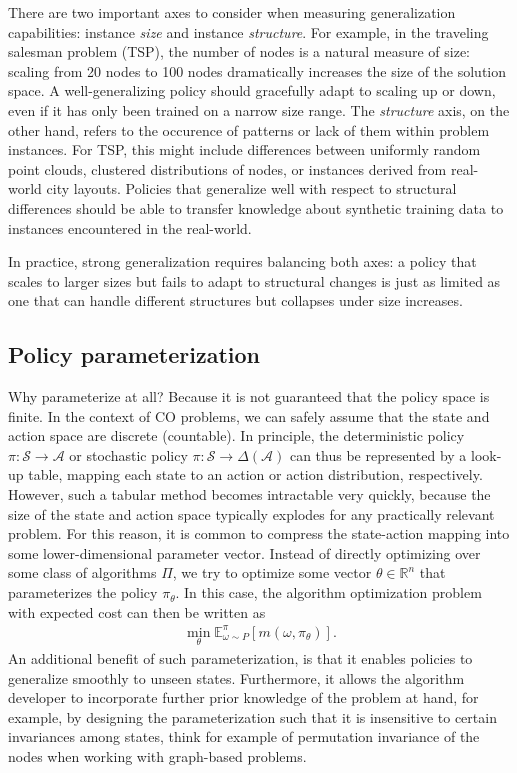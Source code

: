 \documentclass[a4paper]{report}
\theoremstyle{definition}
\theoremstyle{plain}
\newcommand\note[1]{{\color{Navy}\noindent#1}}
\begin{document}
There are two important axes to consider when measuring generalization
capabilities: instance \emph{size} and instance \emph{structure}.
%
For example, in the traveling salesman problem (TSP), the number of nodes is a
natural measure of size: scaling from 20 nodes to 100 nodes dramatically
increases the size of the solution space. A well-generalizing policy should
gracefully adapt to scaling up or down, even if it has only been trained on a
narrow size range.
%
The \emph{structure} axis, on the other hand, refers to the occurence of patterns or
lack of them within problem instances. For TSP, this might include differences
between uniformly random point clouds, clustered distributions of nodes, or
instances derived from real-world city layouts. Policies that generalize well
with respect to structural differences should be able to transfer knowledge
about synthetic training data to instances encountered in the real-world.

In practice, strong generalization requires balancing both axes: a policy that
scales to larger sizes but fails to adapt to structural changes is just as
limited as one that can handle different structures but collapses under size
increases.


\subsection{Policy parameterization}

\note{Why parameterize at all? Because it is not guaranteed that the policy space is finite.}
In the context of CO problems, we can safely assume that the state and action
space are discrete (countable).
%
In principle, the deterministic policy $\pi : \mathcal{S} \rightarrow \mathcal{A}$ or
stochastic policy $\pi : \mathcal{S} \rightarrow \Delta(\mathcal{A})$ can thus be represented by
a look-up table, mapping each state to an action or action distribution,
respectively.
%
However, such a tabular method becomes intractable very quickly, because the
size of the state and action space typically explodes for any practically
relevant problem.
For this reason, it is common to compress the state-action mapping into some
lower-dimensional parameter vector.
%
Instead of directly optimizing over some class of algorithms $\Pi$, we try to
optimize some vector $\theta \in \mathbb{R}^n$ that parameterizes the policy $\pi_\theta$. In
this case, the algorithm optimization problem with expected cost can then be
written as
\begin{align}
  \label{eq:4}
  \min_\theta \mathbb{E}_{\omega \sim P}^\pi \left[ m(\omega, \pi_\theta) \right] .
\end{align}
%
An additional benefit of such parameterization, is that it enables policies to
generalize smoothly to unseen states.
Furthermore, it allows the algorithm developer to incorporate further prior
knowledge of the problem at hand, for example, by designing the parameterization
such that it is insensitive to certain invariances among states, think for
example of permutation invariance of the nodes when working with graph-based
problems.
\end{document}
